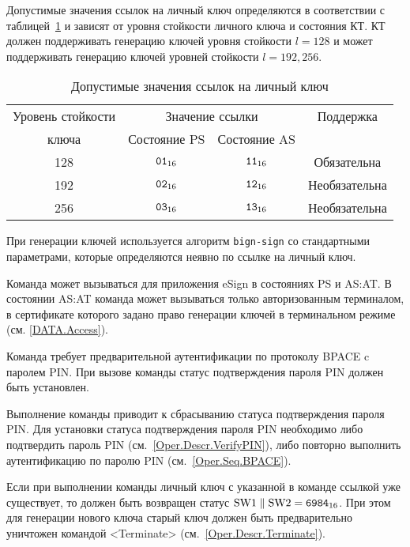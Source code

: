Допустимые значения ссылок на личный ключ определяются
в соответствии с таблицей~\ref{Table.Oper.KeyRef} и зависят от
уровня стойкости личного ключа и состояния КТ.
КТ должен поддерживать генерацию ключей уровня стойкости 
$l=128$ и может поддерживать генерацию ключей 
уровней стойкости $l=192, 256$.

\begin{table}[hbt]
\caption{Допустимые значения ссылок на личный ключ}
\label{Table.Oper.KeyRef}
\begin{tabular}{|c|c|c|c|}
\hline
Уровень стойкости & \multicolumn{2}{|c|}{Значение ссылки} & Поддержка\\
\cline{2-3}
ключа & Состояние PS & Состояние AS & \\
\hline
\hline
128 & $\texttt{01}_{16}$ & $\texttt{11}_{16}$ & Обязательна \\
192 & $\texttt{02}_{16}$ & $\texttt{12}_{16}$ & Необязательна\\
256 & $\texttt{03}_{16}$ & $\texttt{13}_{16}$ & Необязательна\\
\hline
\end{tabular}
\end{table}

При генерации ключей используется алгоритм \texttt{bign-sign}
со стандартными параметрами, которые определяются неявно
по ссылке на личный ключ. 

Команда может вызываться для приложения eSign в состояниях 
PS и AS:AT. В состоянии AS:AT команда может вызываться 
только авторизованным терминалом, в сертификате которого задано право
генерации ключей в терминальном режиме (см. \ref{DATA.Access}).

Команда требует предварительной аутентификации по 
протоколу BPACE c паролем PIN. При вызове
команды статус подтверждения пароля PIN должен быть 
установлен.

Выполнение команды приводит к сбрасыванию статуса подтверждения пароля PIN.
Для установки статуса подтверждения пароля PIN 
необходимо либо подтвердить пароль PIN (см.~\ref{Oper.Descr.VerifyPIN}), 
либо повторно выполнить аутентификацию по паролю PIN (см.~\ref{Oper.Seq.BPACE}).

Если при выполнении команды личный ключ с указанной в команде ссылкой 
уже существует, то должен быть возвращен статус 
$\text{SW1} \parallel \text{SW2} = \texttt{6984}_{16}$. 
При этом для генерации нового ключа старый ключ должен быть предварительно 
уничтожен командой <Terminate> (см.~\ref{Oper.Descr.Terminate}).


